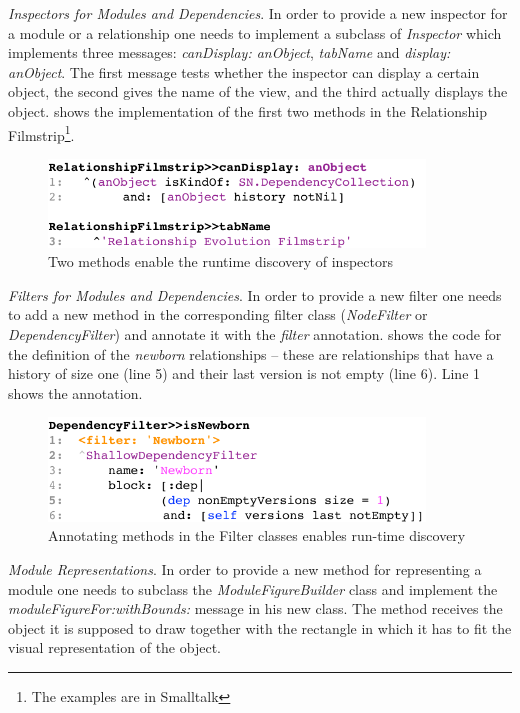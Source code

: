 \documentclass[preprint,12pt]{elsarticle}
\newcommand{\cd}[1]{{\em{#1}}}
\begin{document}
\begin{description}
\item {\em Inspectors for Modules and Dependencies}. In order to provide a new inspector for a module or a relationship one needs to implement a subclass of {\em Inspector} which implements three messages: \cd{canDisplay: anObject}, \cd{tabName} and \cd{display: anObject}. The first message tests whether the inspector can display a certain object, the second gives the name of the view, and the third actually displays the object.  shows the implementation of the first two methods in the Relationship Filmstrip\footnote{The examples are in Smalltalk}.

\begin{figure}[h]
\begin{center}
\includegraphics[width=10cm]{images/filmstrip-sample}
\caption{Two methods enable the runtime discovery of inspectors}
\end{center}
\end{figure}

\item {\em Filters for Modules and Dependencies}. In order to provide a new filter one needs to add a new method in the corresponding filter class (\cd{NodeFilter} or \cd{DependencyFilter}) and annotate it with the \cd{filter} annotation.  shows the code for the definition of the {\em newborn} relationships -- these are relationships that have a history of size one (line 5) and their last version is not empty (line 6). Line 1 shows the annotation.

\begin{figure}[h]
\begin{center}
\includegraphics[width=10cm]{images/filter-sample}
\caption{Annotating methods in the Filter classes enables run-time discovery}
\end{center}
\end{figure}


\item {\em Module Representations}. In order to provide a new method for representing a module one needs to subclass the \cd{ModuleFigureBuilder} class and implement the \cd{moduleFigureFor:withBounds:} message in his new class. The method receives the object it is supposed to draw together with the rectangle in which it has to fit the visual representation of the object.

\end{description} 
\end{document}
